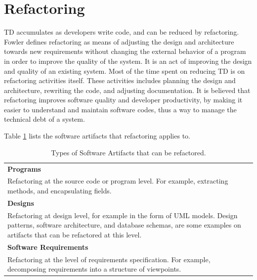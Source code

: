 \section{Refactoring}
\label{sec:2-Refactoring}
TD accumulates as developers write code\cite{Zazworka:2011:PDD:1985362.1985372}, and can be reduced by refactoring. Fowler defines refactoring as means of adjusting the design and architecture towards new requirements without changing the external behavior of a program in order to improve the quality of the system\cite{1999:RID:311424}. It is an act of improving the design and quality of an existing system\cite{Vliet:2008:SEP:1481475}. Most of the time spent on reducing TD is on refactoring activities itself. These activities includes planning the design and architecture, rewriting the code, and adjusting documentation\cite{Pressman:2009:SEP:1593949}. It is believed that refactoring improves software quality and developer productivity, by making it easier to understand and maintain software codes\cite{Kim:2012:FSR:2393596.2393655}, thus a way to manage the technical debt of a system. 

Table \ref{tab:refactorArtifacts} lists the software artifacts that refactoring applies to\cite{1265817}.

\begin{table}[ht!]
	\renewcommand{\arraystretch}{1.2}
	\centering	
	\begin{tabular}{p{}} \hline
		\textbf{Programs} \\Refactoring at the source code or program level. For example, extracting methods, and encapsulating fields. \\ \hline
		\textbf{Designs} \\
		Refactoring at design level, for example in the form of UML models. Design patterns, software architecture, and database schemas, are some examples on artifacts that can be refactored at this level. \\ \hline
		\textbf{Software Requirements} \\
		Refactoring at the level of requirements specification. For example, decomposing requirements into a structure of viewpoints. \\ \hline
	\end{tabular}
	\caption{Types of Software Artifacts that can be refactored.}
	\label{tab:refactorArtifacts}
\end{table}



